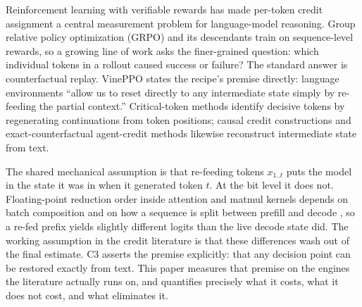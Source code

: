 \documentclass[11pt]{article}
\begin{document}
Reinforcement learning with verifiable rewards has made per-token credit
assignment a central measurement problem for language-model reasoning. Group
relative policy optimization (GRPO) \citep{shao2024deepseekmath} and its descendants
train on sequence-level rewards, so a growing line of work asks the
finer-grained question: which individual tokens in a rollout caused success
or failure? The standard answer is counterfactual replay. VinePPO
\citep{kazemnejad2024vineppo} states the recipe's premise directly: language
environments ``allow us to reset directly to any intermediate state simply by
re-feeding the partial context.'' Critical-token methods
\citep{lin2024critical, ruan2025cft} identify decisive tokens by regenerating
continuations from token positions; causal credit constructions
\citep{khandoga2026beyond} and exact-counterfactual agent-credit methods
\citep{chen2026exact} likewise reconstruct intermediate state from text.

The shared mechanical assumption is that re-feeding tokens $x_{1..t}$ puts
the model in the state it was in when it generated token $t$. At the bit
level it does not. Floating-point reduction order inside attention and
matmul kernels depends on batch composition and on how a sequence is split
between prefill and decode \citep{he2025nondeterminism}, so a re-fed prefix
yields slightly different logits than the live decode state did. The working
assumption in the credit literature is that these differences wash out of
the final estimate. C3 \citep{chen2026exact} asserts the premise explicitly:
that any decision point can be restored exactly from text. This paper
measures that premise on the engines the literature actually runs on, and
quantifies precisely what it costs, what it does not cost, and what
eliminates it.
\end{document}
